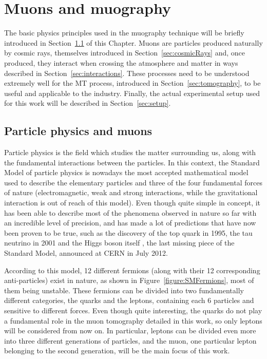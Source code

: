 \documentclass[a4paper, 11pt, twoside, openright]{report}
\begin{document}
\chapter{Muons and muography}

The basic physics principles used in the muography technique will be briefly introduced in Section~\ref{sec:particlePhysics} of this Chapter. Muons are particles produced naturally by cosmic rays, themselves introduced in Section~\ref{sec:cosmicRays} and, once produced, they interact when crossing the atmosphere and matter in ways described in Section~\ref{sec:interactions}. These processes need to be understood extremely well for the MT process, introduced in Section~\ref{sec:tomography}, to be useful and applicable to the industry. Finally, the actual experimental setup used for this work will be described in Section~\ref{sec:setup}.

\section{Particle physics and muons} \label{sec:particlePhysics}

Particle physics is the field which studies the matter surrounding us, along with the fundamental interactions between the particles. In this context, the Standard Model of particle physics \cite{SM} is nowadays the most accepted mathematical model used to describe the elementary particles and three of the four fundamental forces of nature (electromagnetic, weak and strong interactions, while the gravitational interaction is out of reach of this model). Even though quite simple in concept, it has been able to describe most of the phenomena observed in nature so far with an incredible level of precision, and has made a lot of predictions that have now been proven to be true, such as the discovery of the top quark \cite{topQuark} in 1995, the tau neutrino \cite{tauNeutrino} in 2001 and the Higgs boson itself \cite{HiggsDiscovery1, HiggsDiscovery2}, the last missing piece of the Standard Model, announced at CERN in July 2012.

According to this model, 12 different fermions (along with their 12 corresponding anti-particles) exist in nature, as shown in Figure~\ref{figure:SMFermions}, most of them being unstable. These fermions can be divided into two fundamentally different categories, the quarks and the leptons, containing each 6 particles and sensitive to different forces. Even though quite interesting, the quarks do not play a fundamental role in the muon tomography detailed in this work, so only leptons will be considered from now on. In particular, leptons can be divided even more into three different generations of particles, and the muon, one particular lepton belonging to the second generation, will be the main focus of this work.
\end{document}
